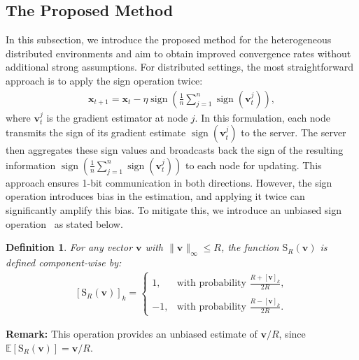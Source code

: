 \documentclass{article}
\newcommand{\E}{\mathbb{E}}
\newtheorem{definition}[theorem]{Definition}
\def \E {\mathbb{E}}
\def \v {\mathbf{v}}
\def \x {\mathbf{x}}
\def \E {\mathbb{E}}
\def \x {\mathbf{x}}
\def \v {\mathbf{v}}
\begin{document}
\subsection{The Proposed Method}
In this subsection, we introduce the proposed method for the heterogeneous distributed environments and aim to obtain improved convergence rates without additional strong assumptions.
For distributed settings, the most straightforward approach is to apply the sign operation twice: %
\begin{align}
    \x_{t+1} = \x_t - \eta \operatorname{sign}\left(\frac{1}{n}\sum_{j=1}^{n} \operatorname{sign}(\v_t^j) \right),
\end{align}
where $\v_t^j$ is the gradient estimator at node $j$. In this formulation, each node transmits the sign of its gradient estimate $\operatorname{sign}(\v_t^j)$ to the server. 
The server then aggregates these sign values and broadcasts back the sign of the resulting information $\operatorname{sign}\left( \frac{1}{n} \sum_{j=1}^{n} \operatorname{sign}(\v_t^j) \right)$ to each node for updating. This approach ensures 1-bit communication in both directions. However, the sign operation introduces bias in the estimation, and applying it twice can significantly amplify this bias. To mitigate this, we introduce an unbiased sign operation~\citep{pmlr-v202-sun23l} as stated below.
\begin{definition}
    For any vector \( \v \) with \( \|\v\|_{\infty} \leq R \), the function $\operatorname{S_\textit{R}}(\v)$ is defined component-wise by:
    \begin{align}\label{mapping}
    [\operatorname{S_\textit{R}}(\v)]_k = \begin{cases}
        1, & \text{with probability } \frac{R+[\v]_k}{2R}, \\ \\
        -1, & \text{with probability } \frac{R-[\v]_k}{2R}.
    \end{cases}
    \end{align}
\end{definition}
\textbf{Remark:} This operation provides an unbiased estimate of \( {\v}/{R} \), since \( \E[\operatorname{S_\textit{R}}(\v)] = {\v}/{R} \). 
\end{document}
